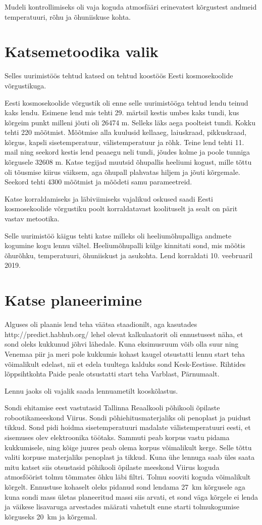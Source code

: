\documentclass{trkut}%
\begin{document}
Mudeli kontrollimiseks oli vaja koguda atmosfääri erinevatest kõrgustest andmeid temperatuuri, rõhu ja õhuniiskuse kohta.

\section{Katsemetoodika valik}
Selles uurimistöös tehtud katsed on tehtud koostöös Eesti kosmosekoolide võrgustikuga.

Eesti kosmosekoolide võrgustik oli enne selle uurimistööga tehtud lendu teinud kaks lendu. Esimene lend mis tehti 29. märtsil kestis umbes kaks tundi, kus kõrgeim punkt milleni jõuti oli 26474 m. Selleks läks aega poolteist tundi. Kokku tehti 220 mõõtmist. Mõõtmise alla kuulusid kellaaeg, laiuskraad, pikkuskraad, kõrgus, kapsli sisetemperatuur, välistemperatuur ja rõhk. Teine lend tehti 11. mail ning seekord kestis lend peaaegu neli tundi, jõudes kolme ja poole tunniga kõrgusele 32608 m. Katse tegijad muutsid õhupallis heeliumi kogust, mille tõttu oli tõusmise kiirus väiksem, aga õhupall plahvatas hiljem ja jõuti kõrgemale. Seekord tehti 4300 mõõtmist ja mõõdeti samu parameetreid.

Katse korraldamiseks ja läbiviimiseks vajalikud oskused saadi Eesti kosmosekoolide võrgustiku poolt korraldatavast koolituselt ja sealt on pärit vastav metootika.

Selle uurimistöö käigus tehti katse milleks oli heeliumõhupalliga andmete kogumine kogu lennu vältel. Heeliumõhupalli külge kinnitati sond, mis mõõtis õhurõhku, temperatuuri, õhuniiskust ja asukohta. Lend korraldati 10. veebruaril 2019.

\section{Katse planeerimine}
Alguses oli plaanis lend teha väätsa staadionilt, aga kasutades http://predict.habhub.org/ lehel olevat kalkulaatorit oli ennustusest näha, et sond oleks kukkunud jõhvi lähedale. Kuna eksimusruum võib olla suur ning Venemaa piir ja meri pole kukkumis kohast kaugel otsustatti lennu start teha võimalikult edelast, nii et edela tuultega kalduks sond Kesk-Eestisse. Rihtides lõppsihtkohta Paide peale otsustatti start teha Varblast, Pärnumaalt.

Lennu jaoks oli vajalik saada lennuametilt kooskõlastus.

Sondi ehitamise eest vastutasid Tallinna Reaalkooli põhikooli õpilaste robootikameeskond Viirus. Sondi põhiehitusmaterjaliks oli penoplast ja puidust tikkud. Sond pidi hoidma sisetemperatuuri madalate välistemperatuuri eesti, et sisemuses olev elektroonika töötaks. Sammuti peab korpus vastu pidama kukkumisele, ning kõige juures peab olema korpus võimalikult kerge. Selle tõttu valiti korpuse materjaliks penoplast ja tikkud. Kuna ühe lennuga saab üles saata mitu katset siis otsustasid põhikooli õpilaste meeskond Viirus koguda atmosföörist tolmu tõmmates õhku läbi filtri. Tolmu sooviti koguda võimalikult kõrgelt. Ennustuse kohaselt oleks pidanud sond lendama \SI{27}{km} kõrgusele aga kuna sondi mass ületas planeeritud massi siis arvati, et sond väga kõrgele ei lenda ja väikese lisavaruga arvestades määrati vahetult enne starti tolmukogumise kõrguseks \SI{20}{km} ja kõrgemal.
\end{document}
